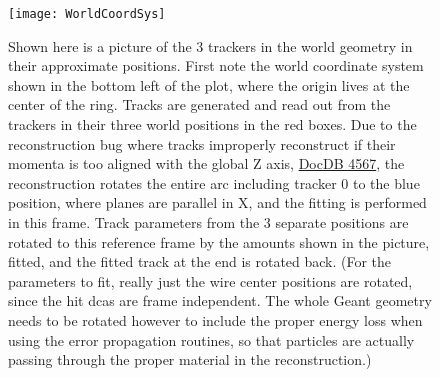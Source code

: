 	\begin{figure}[]
		\caption{Shown here is a picture of the 3 trackers in the world geometry in their approximate positions. First note the world coordinate system shown in the bottom left of the plot, where the origin lives at the center of the ring. Tracks are generated and read out from the trackers in their three world positions in the red boxes. Due to the reconstruction bug where tracks improperly reconstruct if their momenta is too aligned with the global Z axis, \href{http://gm2-docdb.fnal.gov:8080/cgi-bin/ShowDocument?docid=4567}{DocDB 4567}, the reconstruction rotates the entire arc including tracker 0 to the blue position, where planes are parallel in X, and the fitting is performed in this frame. Track parameters from the 3 separate positions are rotated to this reference frame by the amounts shown in the picture, fitted, and the fitted track at the end is rotated back. (For the parameters to fit, really just the wire center positions are rotated, since the hit dcas are frame independent. The whole Geant geometry needs to be rotated however to include the proper energy loss when using the error propagation routines, so that particles are actually passing through the proper material in the reconstruction.)}
	\centering
	\texttt{[image: WorldCoordSys]}
	\label{fig:WorldCoordSys}
	\end{figure}


